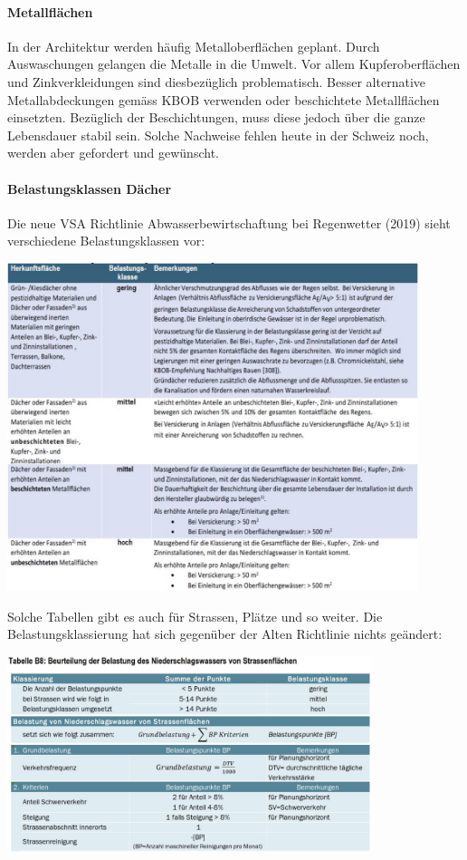 \documentclass[9pt, openright=false]{scrartcl}
\begin{document}
\paragraph{Metallflächen} In der Architektur werden häufig Metalloberflächen geplant. Durch Auswaschungen gelangen die Metalle in die Umwelt. Vor allem Kupferoberflächen und Zinkverkleidungen sind diesbezüglich problematisch. Besser alternative Metallabdeckungen gemäss KBOB verwenden oder beschichtete Metallflächen einsetzten. Bezüglich der Beschichtungen, muss diese jedoch über die ganze Lebensdauer stabil sein. Solche Nachweise fehlen heute in der Schweiz noch, werden aber gefordert und gewünscht.
\paragraph{Belastungsklassen Dächer} Die neue VSA Richtlinie Abwasserbewirtschaftung bei Regenwetter (2019) sieht verschiedene Belastungsklassen vor:
\begin{center}
\includegraphics[width=0.9\textwidth]{images/belastungsklassen}
\end{center}
Solche Tabellen gibt es auch für Strassen, Plätze und so weiter. Die Belastungsklassierung hat sich gegenüber der Alten Richtlinie nichts geändert: 
\begin{center}
\includegraphics[width=0.8\textwidth]{images/belastungsklassierung}
\end{center}\par \clearpage
\end{document}
